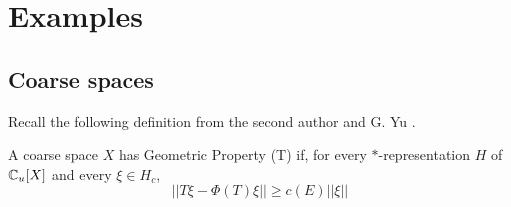 \section{Examples}

\subsection{Coarse spaces}

Recall the following definition from the second author and G. Yu \cite{WillettYu}.

\begin{definition} A coarse space $X$ has Geometric Property (T) if, for every $*$-representation $H$ of $\mathbb C_u [X]$ and every $\xi \in H_c$,
\[ ||T\xi - \Phi(T)\xi|| \geq c(E) ||\xi||\]
\end{definition}
